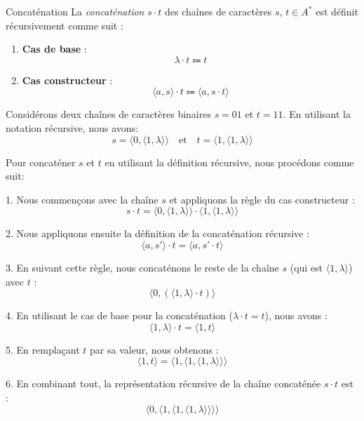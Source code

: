\documentclass[16pt]{report}
\begin{document}
\begin{multicols*}{2}
            \begin{Definitionx}{Concaténation}{}
                La \textit{concaténation} $s\cdot t$ des chaînes de caractères $s$, $t \in A^*$ est définit 
                récursivement comme suit : 
                \begin{enumerate}
                    \item \textbf{Cas de base} : 
                                        \[ \lambda \cdot t \Coloneqq t \] 
                    \item \textbf{Cas constructeur} :  
                                        \[ \langle a, s \rangle \cdot t \Coloneqq \langle a, s \cdot t\rangle \]   
                \end{enumerate}

            \end{Definitionx}       


\begin{EExample}{}{}
Considérons deux chaînes de caractères binaires $s = 01$ et $t = 11$. En utilisant la notation récursive, nous avons:
\[
s = \langle 0, \langle 1, \lambda \rangle \rangle \quad \text{et} \quad t = \langle 1, \langle 1, \lambda \rangle \rangle
\]

Pour concaténer $s$ et $t$ en utilisant la définition récursive, nous procédons comme suit:

1. Nous commençons avec la chaîne $s$ et appliquons la règle du cas constructeur :
\[
s \cdot t = \langle 0, \langle 1, \lambda \rangle \rangle \cdot \langle 1, \langle 1, \lambda \rangle \rangle
\]

2. Nous appliquons ensuite la définition de la concaténation récursive :
\[
\langle a, s' \rangle \cdot t = \langle a, s' \cdot t \rangle
\]

3. En suivant cette règle, nous concaténons le reste de la chaîne $s$ (qui est $\langle 1, \lambda \rangle$) avec $t$ :
\[
\langle 0, (\langle 1, \lambda \rangle \cdot t) \rangle
\]

4. En utilisant le cas de base pour la concaténation ($\lambda \cdot t = t$), nous avons :
\[
\langle 1, \lambda \rangle \cdot t = \langle 1, t \rangle
\]

5. En remplaçant $t$ par sa valeur, nous obtenons :
\[
\langle 1, t \rangle = \langle 1, \langle 1, \langle 1, \lambda \rangle \rangle \rangle
\]

6. En combinant tout, la représentation récursive de la chaîne concaténée $s \cdot t$ est :
\[
\langle 0, \langle 1, \langle 1, \langle 1, \lambda \rangle \rangle \rangle \rangle
\]


\end{EExample}
\end{multicols*}
\end{document}
